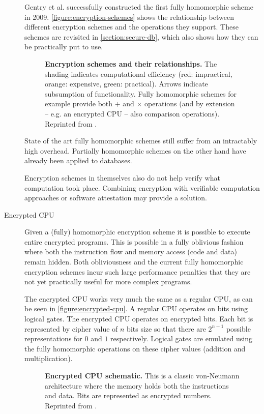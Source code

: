 \begin{description}
Gentry et al. successfully constructed the first fully homomorphic scheme in 2009.\cite[]{Gentry2009}\label{ID_233387469}
\autoref{figure:encryption-schemes} shows the relationship between different encryption schemes and the operations they support. These schemes are revisited in \autoref{section:secure-db}, which also shows how they can be practically put to use.\label{ID_129969722}
\begin{figure}[htbp]
\makebox[\textwidth][c]{
}\caption{\textbf{Encryption schemes and their relationships.}\label{ID_489936542}
The shading indicates computational efficiency (red: impractical, orange: expensive, green: practical). Arrows indicate subsumption of functionality. Fully homomorphic schemes for example provide both $+$ and $\times$ operations (and by extension -- e.g. an encrypted CPU -- also comparison operations).\label{ID_1527882742}
Reprinted from \cite{querying-encrypted-data-tutorial}.\label{ID_467588759}
\label{ID_452615921}\label{figure:encryption-schemes}}
\end{figure}

State of the art fully homomorphic schemes still suffer from an intractably high overhead. Partially homomorphic schemes on the other hand have already been applied to databases.\cite{Baumann2014,querying-encrypted-data-tutorial}\label{ID_1599544022}

Encryption schemes in themselves also do not help verify what computation took place. Combining encryption with verifiable computation approaches or software attestation may provide a solution.\label{ID_717622838}
\item[Encrypted CPU]\label{ID_1403278513}
Given a (fully) homomorphic encryption scheme it is possible to execute entire encrypted programs. This is possible in a fully oblivious fashion where both the instruction flow and memory access (code and data) remain hidden.\label{ID_601974181}
Both obliviousness and the current fully homomorphic encryption schemes incur such large performance penalties that they are not yet practically useful for more complex programs.\label{ID_312856627}

The encrypted CPU works very much the same as a regular CPU, as can be seen in \autoref{figure:encrypted-cpu}. A regular CPU operates on bits using logical gates. The encrypted CPU operates on encrypted bits. Each bit is represented by cipher value of $n$ bits size so that there are $2^{n-1}$ possible representations for $0$ and $1$ respectively. Logical gates are emulated using the fully homomorphic operations on these cipher values (addition and multiplication).\cite[]{Brenner2011}\label{ID_1020198095}
\begin{figure}[htbp]
\caption{\textbf{Encrypted CPU schematic.} This is a classic von-Neumann architecture where the memory holds both the instructions and data. Bits are represented as encrypted numbers. Reprinted from \cite{Brenner2011a}.\label{ID_901443426}\label{figure:encrypted-cpu}\label{ID_901443426}\label{figure:encrypted-cpu}}
\end{figure}


\end{description}
